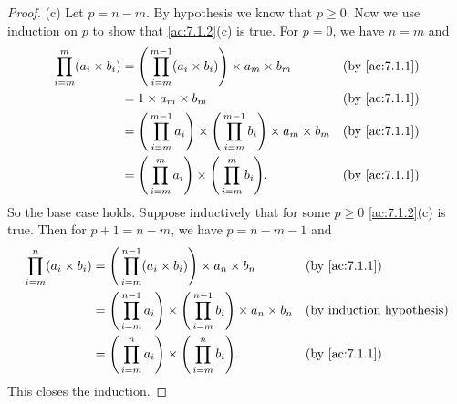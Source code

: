 \begin{proof}{(c)}
  Let \(p = n - m\).
  By hypothesis we know that \(p \geq 0\).
  Now we use induction on \(p\) to show that \cref{ac:7.1.2}(c) is true.
  For \(p = 0\), we have \(n = m\) and
  \begin{align*}
    \prod_{i = m}^m (a_i \times b_i) & = \Bigg(\prod_{i = m}^{m - 1} (a_i \times b_i)\Bigg) \times a_m \times b_m                                 &  & \by{ac:7.1.1} \\
                                     & = 1 \times a_m \times b_m                                                                                  &  & \by{ac:7.1.1} \\
                                     & = \Bigg(\prod_{i = m}^{m - 1} a_i\Bigg) \times \Bigg(\prod_{i = m}^{m - 1} b_i\Bigg) \times a_m \times b_m &  & \by{ac:7.1.1} \\
                                     & = \Bigg(\prod_{i = m}^m a_i\Bigg) \times \Bigg(\prod_{i = m}^m b_i\Bigg).                                  &  & \by{ac:7.1.1}
  \end{align*}
  So the base case holds.
  Suppose inductively that for some \(p \geq 0\) \cref{ac:7.1.2}(c) is true.
  Then for \(p + 1 = n - m\), we have \(p = n - m - 1\) and
  \begin{align*}
    \prod_{i = m}^n (a_i \times b_i) & = \Bigg(\prod_{i = m}^{n - 1} (a_i \times b_i)\Bigg) \times a_n \times b_n                                 &  & \by{ac:7.1.1} \\
                                     & = \Bigg(\prod_{i = m}^{n - 1} a_i\Bigg) \times \Bigg(\prod_{i = m}^{n - 1} b_i\Bigg) \times a_n \times b_n &  & \byIH         \\
                                     & = \Bigg(\prod_{i = m}^n a_i\Bigg) \times \Bigg(\prod_{i = m}^n b_i\Bigg).                                  &  & \by{ac:7.1.1}
  \end{align*}
  This closes the induction.
\end{proof}

